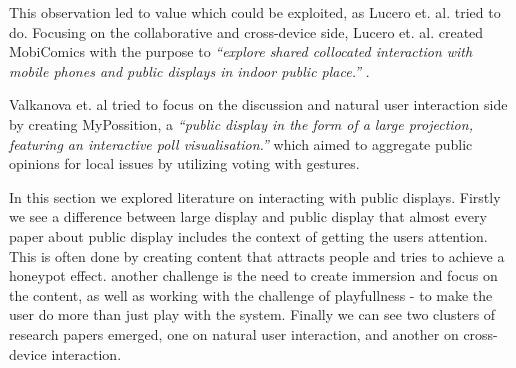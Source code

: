 This observation led to value which could be exploited, as Lucero et. al. tried to do. 
Focusing on the collaborative and cross-device side, Lucero et. al. created MobiComics with the purpose to \emph{``explore shared collocated interaction with mobile phones and public displays in indoor public place.''} \cite{Lucero:2012}. 

Valkanova et. al tried to focus on the discussion and natural user interaction side by creating MyPossition, a \emph{``public display in the form of a large projection, featuring an interactive poll visualisation.''} \cite{Valkanova:2014} which aimed to aggregate public opinions for local issues by utilizing voting with gestures.

In this section we explored literature on interacting with public displays. Firstly we see a difference between large display and public display that almost every paper about public display includes the context of getting the users attention. This is often done by creating content that attracts people and tries to achieve a honeypot effect. another challenge  is the need to create immersion and focus on the content, as well as  working with the challenge of playfullness - to make the user do more than just play with the system. Finally we can see two clusters of research papers emerged, one on natural user interaction, and another on cross-device interaction.

